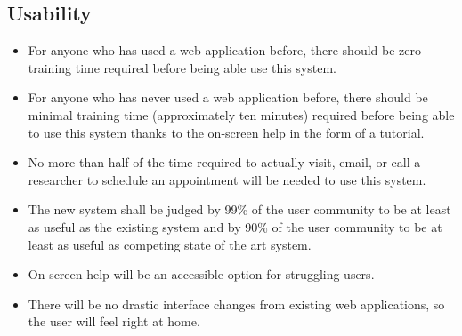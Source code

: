 \subsection{Usability}
\begin{itemize}
\item For anyone who has used a web application before, there should be zero training time required before being able use this system.
\item For anyone who has never used a web application before, there should be minimal training time (approximately ten minutes) required before being able to use this system thanks to the on-screen help in the form of a tutorial.
\item No more than half of the time required to actually visit, email, or call a researcher to schedule an appointment will be needed to use this system.
\item The new system shall be judged by 99\% of the user community to be at least as useful as the existing system and by 90\% of the user community to be at least as useful as competing state of the art system.
\item On-screen help will be an accessible option for struggling users.
\item There will be no drastic interface changes from existing web applications, so the user will feel right at home.
\end{itemize}
